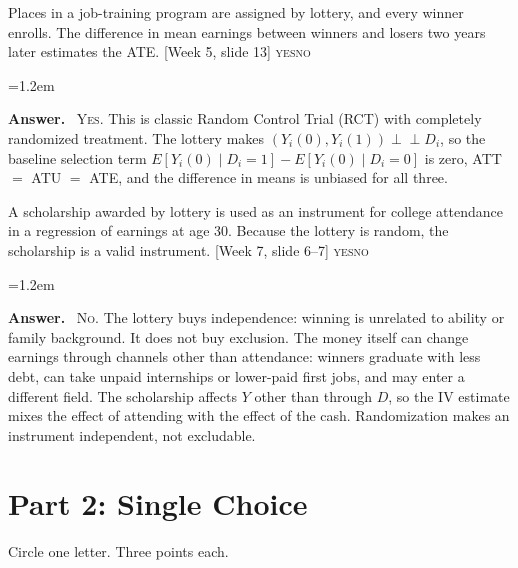 \documentclass[11pt]{article}
\newcommand{\E}{E}
\newcommand{\indep}{\perp\!\!\!\perp}
\newenvironment{answer}{\par\smallskip
  \begin{list}{}{\leftmargin=1.2em\rightmargin=0pt}\item[]\color{dukeblue}%
  \textbf{Answer.}\ }{\end{list}\smallskip}
\newcommand{\yn}{\nolinebreak\hspace*{1em plus 1fill}\mbox{\textsc{yes}\quad\textsc{no}}}
\newcommand{\slideref}[2]{{\footnotesize\color{gray}[Week #1, slide #2]}}
\begin{document}
\begin{enumerate}[leftmargin=*,itemsep=6pt]
\item Places in a job-training program are assigned by lottery, and every winner enrolls.
      The difference in mean earnings between winners and losers two years later estimates
      the ATE. \slideref{5}{13} \yn
\begin{answer}
\textsc{Yes}. This is classic Random Control Trial (RCT) with completely randomized treatment. The lottery makes $(Y_i(0), Y_i(1)) \indep D_i$, so the baseline selection
term $\E[Y_i(0)\mid D_i=1] - \E[Y_i(0)\mid D_i=0]$ is zero, ATT $=$ ATU $=$ ATE, and the
difference in means is unbiased for all three.
\end{answer}

\item A scholarship awarded by lottery is used as an instrument for college attendance in
      a regression of earnings at age 30. Because the lottery is random, the scholarship is
      a valid instrument. \slideref{7}{6--7} \yn
\begin{answer}
\textsc{No}. The lottery buys independence: winning is unrelated to ability or family
background. It does not buy exclusion. The money itself can change earnings through
channels other than attendance: winners graduate with less debt, can take unpaid
internships or lower-paid first jobs, and may enter a different field. The scholarship
affects $Y$ other than through $D$, so the IV estimate mixes the effect of attending with
the effect of the cash. Randomization makes an instrument independent, not excludable.
\end{answer}
\end{enumerate}

\newpage
\section*{Part 2: Single Choice}
Circle one letter. Three points each.
\end{document}
